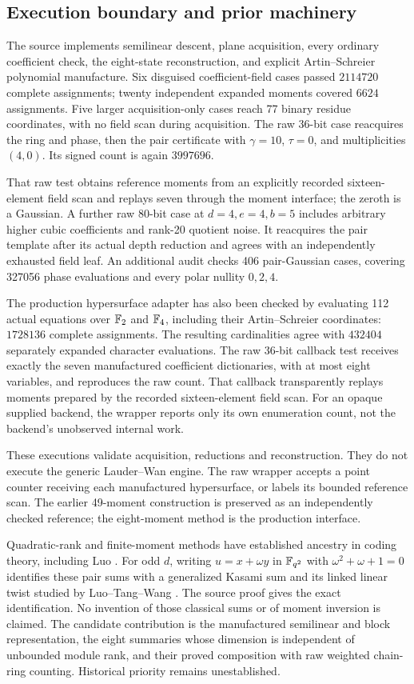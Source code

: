 \subsection{Execution boundary and prior machinery}
The source implements semilinear descent, plane acquisition, every
ordinary coefficient check, the eight-state reconstruction, and explicit
Artin--Schreier polynomial manufacture. Six disguised coefficient-field
cases passed $2114720$ complete assignments; twenty independent expanded
moments covered $6624$ assignments. Five larger acquisition-only cases
reach 77 binary residue coordinates, with no field scan during acquisition.
The raw 36-bit case reacquires the ring and phase, then the pair certificate
with $\gamma=10$, $\tau=0$, and multiplicities $(4,0)$. Its signed count
is again $3997696$.

That raw test obtains reference moments from an explicitly recorded
sixteen-element field scan and replays seven through the moment interface;
the zeroth is a Gaussian. A further raw 80-bit case at $d=4,e=4,b=5$
includes arbitrary higher cubic coefficients and rank-20 quotient noise.
It reacquires the pair template after its actual depth reduction and
agrees with an independently exhausted field leaf. An additional audit
checks 406 pair-Gaussian cases, covering 327056 phase evaluations and
every polar nullity $0,2,4$.

The production hypersurface adapter has also been checked by evaluating
112 actual equations over $\mathbb F_2$ and $\mathbb F_4$, including their
Artin--Schreier coordinates: $1728136$ complete assignments. The resulting
cardinalities agree with $432404$ separately expanded character evaluations.
The raw 36-bit callback test receives exactly the seven manufactured
coefficient dictionaries, with at most eight variables, and reproduces
the raw count. That callback transparently replays moments prepared by
the recorded sixteen-element field scan. For an opaque supplied backend,
the wrapper reports only its own enumeration count, not the backend's
unobserved internal work.

These executions validate acquisition, reductions and reconstruction.
They do not execute the generic Lauder--Wan engine. The raw wrapper
accepts a point counter receiving each manufactured hypersurface, or
labels its bounded reference scan. The earlier 49-moment construction
is preserved as an independently checked reference; the eight-moment
method is the production interface.

Quadratic-rank and finite-moment methods have established ancestry in
coding theory, including Luo \cite{luomoments}. For odd $d$, writing
$u=x+\omega y$ in $\mathbb F_{q^2}$ with $\omega^2+\omega+1=0$ identifies
these pair sums with a generalized Kasami sum and its linked linear
twist studied by Luo--Tang--Wang \cite{kasami}. The source proof gives
the exact identification. No invention of those classical sums or of
moment inversion is claimed. The candidate contribution is the
manufactured semilinear and block representation, the eight summaries
whose dimension is independent of unbounded module rank, and their
proved composition with raw weighted chain-ring counting. Historical
priority remains unestablished.

